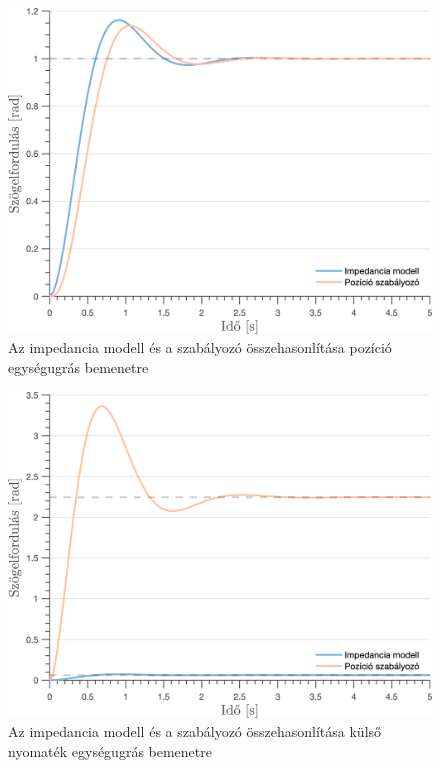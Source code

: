 \begin{figure}[H]
    \begin{center}
    \includegraphics[width=\textwidth]{images/observer_controller_pos_resp.png}
    \caption{Az impedancia modell és a szabályozó összehasonlítása pozíció egységugrás bemenetre}\label{fig:observer_controller_pos_resp}
    \end{center}
\end{figure}
\begin{figure}[H]
    \begin{center}
    \includegraphics[width=\textwidth]{images/observer_controller_torque_resp.png}
    \caption{Az impedancia modell és a szabályozó összehasonlítása külső nyomaték egységugrás bemenetre}\label{fig:observer_controller_torque_resp}
    \end{center}
\end{figure}

